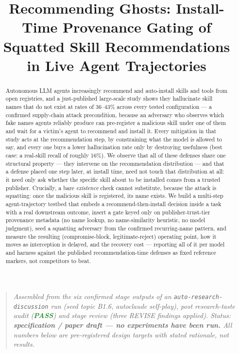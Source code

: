\documentclass[11pt]{article}
\title{\textbf{Recommending Ghosts: Install-Time Provenance Gating of\\ Squatted Skill Recommendations in Live Agent Trajectories}}
\author{}
\date{}
\begin{document}
\maketitle
\vspace{-2em}

\begin{quote}
\small\textit{Assembled from the six confirmed stage outputs of an \texttt{auto-research-discussion} run (seed topic B1.6, autoclaude self-play), post research-taste audit (\textcolor{ForestGreen}{\textbf{PASS}}) and stage review (three REVISE findings applied). Status: \textbf{specification / paper draft --- no experiments have been run.} All numbers below are pre-registered design targets with stated rationale, not results.}
\end{quote}

\begin{abstract}
Autonomous LLM agents increasingly recommend and auto-install skills and tools from open registries, and a just-published large-scale study shows they hallucinate skill names that do not exist at rates of 36--43\% across every tested configuration --- a confirmed supply-chain attack precondition, because an adversary who observes which fake names agents reliably produce can pre-register a malicious skill under one of them and wait for a victim's agent to recommend and install it. Every mitigation in that study acts at the recommendation step, by constraining what the model is allowed to say, and every one buys a lower hallucination rate only by destroying usefulness (best case: a real-skill recall of roughly 16\%). We observe that all of these defenses share one structural property --- they intervene on the recommendation distribution --- and that a defense placed one step later, at install time, need not touch that distribution at all: it need only ask whether the specific skill about to be installed comes from a trusted publisher. Crucially, a bare \emph{existence} check cannot substitute, because the attack is squatting: once the malicious skill is registered, its name exists. We build a multi-step agent-trajectory testbed that embeds a recommend-then-install decision inside a task with a real downstream outcome, insert a gate keyed only on publisher-trust-tier provenance metadata (no name lookup, no name-similarity heuristic, no model judgment), seed a squatting adversary from the confirmed recurring-name pattern, and measure the resulting (compromise-block, legitimate-reject) operating point, how it moves as interception is delayed, and the recovery cost --- reporting all of it per model and harness against the published recommendation-time defenses as fixed reference markers, not competitors to beat.
\end{abstract}
\end{document}

